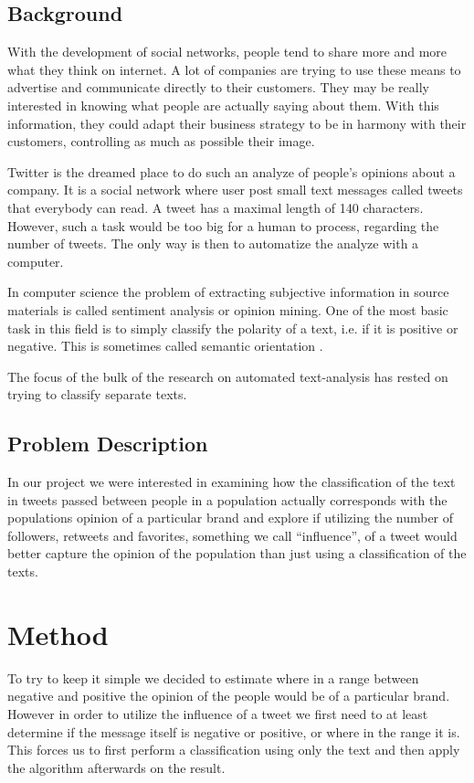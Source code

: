\documentclass[a4paper,12pt]{report}
\begin{document}
\section{Background}

With the development of social networks, people tend to share more and more what they think on internet.
A lot of companies are trying to use these means to advertise and communicate directly to their customers.
They may be really interested in knowing what people are actually saying about them.
With this information, they could adapt their business strategy to be in harmony with their customers, controlling as much as possible their image.

Twitter is the dreamed place to do such an analyze of people's opinions about a company. It is a social network where user post small text messages called tweets that everybody can read. A tweet has a maximal length of 140 characters. However, such a task would be too big for a human to process, regarding the number of tweets. The only way is then to automatize the analyze with a computer.

In computer science the problem of extracting subjective information in source materials is called sentiment analysis or opinion mining. 
One of the most basic task in this field is to simply classify the polarity of a text, i.e. if it is positive or negative. 
This is sometimes called semantic orientation \cite{SenWiki}. 

The focus of the bulk of the research on automated text-analysis has rested on trying to classify separate texts.


\section{Problem Description}

In our project we were interested in examining how the classification of the text in tweets passed between people in a population actually corresponds with the populations opinion of a particular brand and explore if utilizing the number of followers, retweets and favorites, something we call ``influence'', of a tweet would better capture the opinion of the population than just using a classification of the texts. 

\chapter{Method}

To try to keep it simple we decided to estimate where in a range between negative and positive the opinion of the people would be of a particular brand.
However in order to utilize the influence of a tweet we first need to at least determine if the message itself is negative or positive, or where in the range it is.
This forces us to first perform a classification using only the text and then apply the algorithm afterwards on the result.
\end{document}
